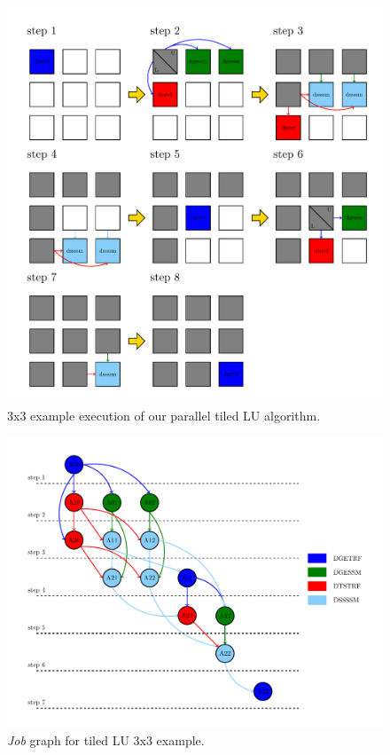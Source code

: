 \begin{figure}[!ht]
\center
\includegraphics[width=0.8\columnwidth]{figures/3x3example}
\caption{3x3 example execution of our parallel tiled LU algorithm.}
\label{fig:3x3lu_example}
\end{figure}

\begin{figure}[!ht]
\center
\includegraphics[width=0.8\columnwidth]{figures/lu_task_graph_3x3}
\caption{\emph{Job} graph for tiled LU 3x3 example.}
\label{fig:lu_task_graph_3x3}
\end{figure}

